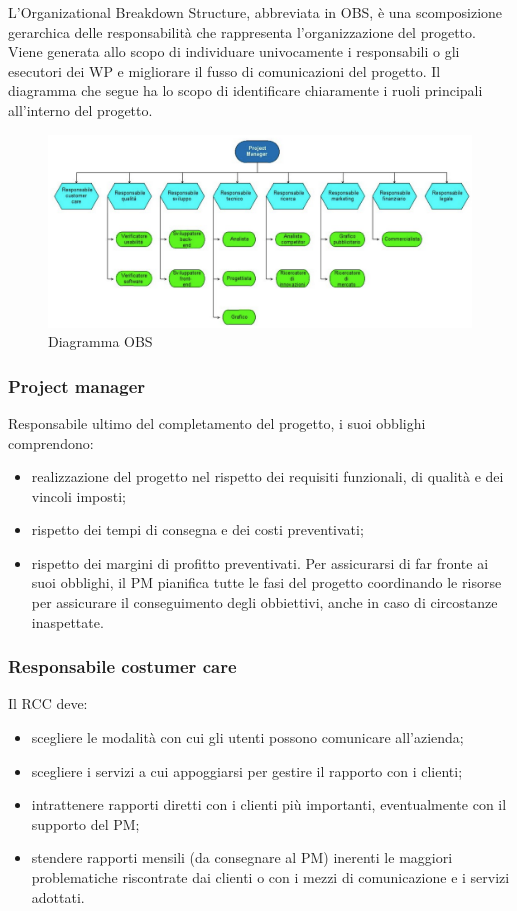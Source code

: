 L\textquoteright{}Organizational Breakdown Structure, abbreviata in OBS, \`{e} una scomposizione gerarchica delle responsabilit\`{a} che rappresenta l\textquoteright{}organizzazione del progetto. Viene generata allo scopo di individuare univocamente i responsabili o gli esecutori dei WP e migliorare il fusso di comunicazioni del progetto. Il diagramma che segue ha lo scopo di identificare chiaramente i ruoli principali all\textquoteright{}interno del progetto.

\begin{figure}[H]
\centering %
\includegraphics[scale=0.4]{img/Progetto2.png}
\caption{Diagramma OBS}
\label{fig:Diagramma OBS}
\end{figure}

\subsubsection{Project manager}
Responsabile ultimo del completamento del progetto, i suoi obblighi comprendono:
\begin{itemize}
\item realizzazione del progetto nel rispetto dei requisiti funzionali, di qualit\`{a} e dei
vincoli imposti;
\item rispetto dei tempi di consegna e dei costi preventivati;
\item rispetto dei margini di profitto preventivati.
Per assicurarsi di far fronte ai suoi obblighi, il PM pianifica tutte le fasi del progetto
coordinando le risorse per assicurare il conseguimento degli obbiettivi, anche in caso di
circostanze inaspettate.
\end{itemize}

\subsubsection{Responsabile costumer care}
Il RCC deve:
\begin{itemize}
\item scegliere le modalit\`{a} con cui gli utenti possono comunicare all\textquoteright{}azienda;
\item scegliere i servizi a cui appoggiarsi per gestire il rapporto con i clienti;
\item intrattenere rapporti diretti con i clienti pi\`{u} importanti, eventualmente con il
supporto del PM;
\item stendere rapporti mensili (da consegnare al PM) inerenti le maggiori problematiche
riscontrate dai clienti o con i mezzi di comunicazione e i servizi adottati.
\end{itemize}

